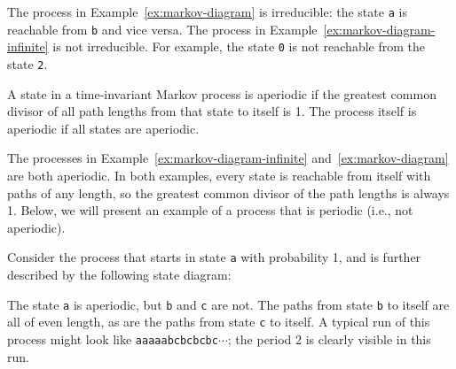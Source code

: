 The process in Example~\ref{ex:markov-diagram} is irreducible: the state \texttt{a} is reachable from \texttt{b} and vice versa.  The process in Example~\ref{ex:markov-diagram-infinite} is not irreducible. For example, the state \texttt{0} is not reachable from the state \texttt{2}.

\begin{definition}
A state in a time-invariant Markov process is aperiodic if the greatest common divisor of all path lengths from that state to itself is 1. The process itself is aperiodic if all states are aperiodic.
\end{definition}

The processes in Example~\ref{ex:markov-diagram-infinite} and~\ref{ex:markov-diagram} are both aperiodic. In both examples, every state is reachable from itself with paths of any length, so the greatest common divisor of the path lengths is always 1. Below, we will present an example of a process that is periodic (i.e., not aperiodic).

\begin{example}\label{ex:periodic-markov-process}
Consider the process that starts in state \texttt{a} with probability 1, and is further described by the following state diagram:
\begin{center}
\end{center}
The state \texttt{a} is aperiodic, but \texttt{b} and \texttt{c} are not. The paths from state \texttt{b} to itself are all of even length, as are the paths from state \texttt{c} to itself. A typical run of this process might look like \texttt{aaaaabcbcbcbc}$\cdots$; the period 2 is clearly visible in this run.
\end{example}

